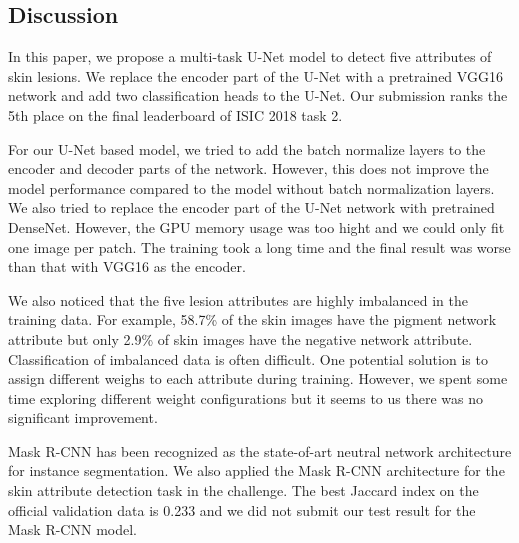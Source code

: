 \documentclass{article}
\begin{document}


\subsection{Discussion}
In this paper, we propose a multi-task U-Net model to detect five attributes of skin lesions. We replace the encoder part of the U-Net with a pretrained VGG16 network and add two classification heads to the U-Net. Our submission ranks the 5th place on the final leaderboard of ISIC 2018 task 2. 

For our U-Net based model, we tried to add the batch normalize layers to the encoder and decoder parts of the network. However, this does not improve the model performance compared to the model without batch normalization layers. We also tried to replace the encoder part of the U-Net network with pretrained DenseNet. However, the GPU memory usage was too hight and we could only fit one image per patch. The training took a long time and the final result was worse than that with VGG16 as the encoder. 

We also noticed that the five lesion attributes are highly imbalanced in the training data. For example, 58.7\% of the skin images have the pigment network attribute but only 2.9\% of skin images have the negative network attribute. Classification of imbalanced data is often difficult. One potential solution is to assign different weighs to each attribute during training. However, we spent some time exploring different weight configurations but it seems to us there was no significant improvement. 

Mask R-CNN has been recognized as the state-of-art neutral network architecture for instance segmentation.  We also applied the Mask R-CNN architecture for the skin attribute detection task in the challenge. The best Jaccard index on the official validation data is 0.233 and we did not submit our test result for the Mask R-CNN model. 



\end{document}
